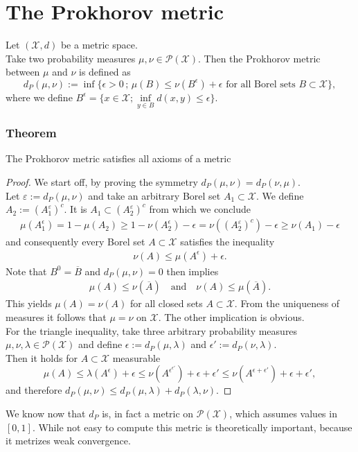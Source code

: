 \documentclass[11pt,a4paper]{article}
\begin{document}
\section{The Prokhorov metric}
Let $(\mathcal{X},d)$ be a metric space.\vspace{1em}\\
Take two probability measures $\mu,\nu\in\mathcal{P(X)}$. Then the Prokhorov metric between $\mu$ and $\nu$ is defined as
\[
d_P(\mu,\nu):=\inf\lbrace\epsilon{}>0\,;\,\mu(B)\leq\nu(B^\epsilon)+\epsilon \,\,\text{for all Borel sets}\,\,B\subset\mathcal{X}\rbrace,
\]
where we define $B^\epsilon = \lbrace{}x\in\mathcal{X};\inf\limits_{y\in{}B}d(x,y)\leq\epsilon\rbrace.$\vspace{1em}\\
\subsubsection{Theorem}
The Prokhorov metric satisfies all axioms of a metric
\begin{proof}
We start off, by proving the symmetry $d_P(\mu,\nu)=d_P(\nu,\mu)$. \\Let $\varepsilon:=d_P(\mu,\nu)$ and take an arbitrary Borel set $A_1\subset\mathcal{X}$. We define $A_2:=\left(A_1^{\varepsilon}\right)^{c}$. It is $A_1\subset\left(A_2^{\varepsilon}\right)^{c}$ from which we conclude
\begin{align*}
\mu(A_1^{\epsilon}) = 1-\mu(A_2)\geq{}1-\nu(A_2^{\epsilon})-\epsilon=\nu\left(\left(A_2^{\varepsilon}\right)^{c}\right)-\epsilon\geq\nu(A_1)-\epsilon
\end{align*}
and consequently every Borel set $A\subset\mathcal{X}$ satisfies the inequality
\begin{align*}
\nu(A)\leq\mu(A^\epsilon)+\epsilon.
\end{align*}
Note that $B^0=\overline{B}$ and $d_P(\mu,\nu)=0$ then implies 
\begin{align*}
\mu(A)\leq\nu(\overline{A})\quad\text{and}\quad\nu(A)\leq\mu(\overline{A}).
\end{align*}
This yields $\mu(A)=\nu(A)$ for all closed sets $A\subset\mathcal{X}$. From the uniqueness of measures it follows that $\mu=\nu$ on $\mathcal{X}$. The other implication is obvious.\vspace{1em}\\
For the triangle inequality, take three arbitrary probability measures $\mu,\nu,\lambda\in\mathcal{P(X)}$ and define $\epsilon:=d_P(\mu,\lambda)$ and $\epsilon':=d_P(\nu,\lambda).$ \vspace{1em}\\Then it holds for $A\subset\mathcal{X}$ measurable
\[
\mu(A)\leq\lambda(A^{\epsilon})+\epsilon\leq\nu(A^{\epsilon^{\epsilon'}})+\epsilon+\epsilon'\leq\nu(A^{\epsilon+\epsilon'})+\epsilon+\epsilon',
\]
and therefore $d_P(\mu,\nu)\leq{}d_P(\mu,\lambda)+d_P(\lambda,\nu).$
\end{proof}
\noindent{}We know now that $d_P$ is, in fact a metric on $\mathcal{P(X)}$, which assumes values in $[0,1]$. While not easy to compute this metric is theoretically important, because it metrizes weak convergence.
\end{document}
